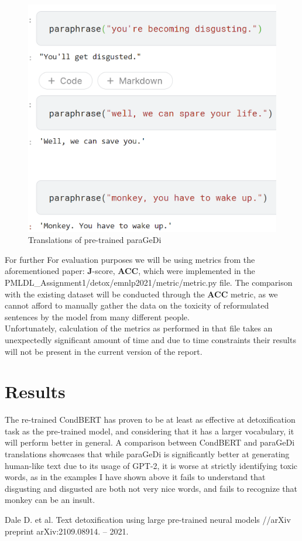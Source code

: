 \documentclass[]{article}
\begin{document}
	\begin{figure}[H]
		\includegraphics[scale=1]{../figures/parapa.png}
		\caption{Translations of pre-trained paraGeDi}
	\end{figure} 
	
	For further For evaluation purposes we will be using metrics from the aforementioned paper: \textbf{J}-score, \textbf{ACC}, which were implemented in the PMLDL\_Assignment1/detox/emnlp2021/metric/metric.py file. The comparison with the existing dataset will be conducted through the \textbf{ACC} metric, as we cannot afford to manually gather the data on the toxicity of reformulated sentences by the model from many different people. \\
	
	Unfortunately, calculation of the metrics as performed in that file takes an unexpectedly significant amount of time and due to time constraints their results will not be present in the current version of the report.
	
	\section{Results}
	
	The re-trained CondBERT has proven to be at least as effective at detoxification task as the pre-trained model, and considering that it has a larger vocabulary, it will perform better in general. A comparison between CondBERT and paraGeDi translations showcases that while paraGeDi is significantly better at generating human-like text due to its usage of GPT-2, it is worse at strictly identifying toxic words, as in the examples I have shown above it fails to understand that disgusting and disgusted are both not very nice words, and fails to recognize that monkey can be an insult.
	
	
	\begin{thebibliography}{99}
		 Dale D. et al. Text detoxification using large pre-trained neural models //arXiv preprint arXiv:2109.08914. – 2021.
	\end{thebibliography}
	
\end{document}
